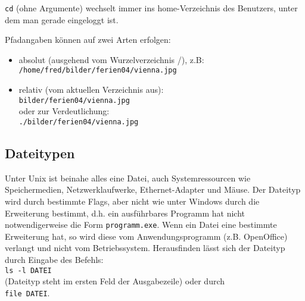 \documentclass[11pt]{article}
\begin{document}
\texttt{cd} (ohne Argumente) wechselt immer ins home-Verzeichnis des
Benutzers, unter dem man gerade eingeloggt ist.

Pfadangaben können auf zwei Arten erfolgen:
\begin{itemize}
\item absolut (ausgehend vom Wurzelverzeichnis /), z.B: \\
\texttt{/home/fred/bilder/ferien04/vienna.jpg}
\item relativ (vom aktuellen Verzeichnis aus):\\
\texttt{bilder/ferien04/vienna.jpg}\\
oder zur Verdeutlichung:\\
\texttt{./bilder/ferien04/vienna.jpg}
\end{itemize}

\subsection{Dateitypen}
Unter Unix ist beinahe alles eine Datei, auch Systemressourcen wie
Speichermedien, Netzwerklaufwerke, Ethernet-Adapter und Mäuse. Der
Dateityp wird durch bestimmte Flags, aber nicht wie unter Windows durch
die Erweiterung bestimmt, d.h. ein ausführbares Programm hat nicht
notwendigerweise die Form \texttt{programm.exe}. Wenn ein Datei eine
bestimmte Erweiterung hat, so wird diese vom Anwendungsprogramm (z.B.
OpenOffice) verlangt und nicht vom Betriebssystem. Herausfinden lässt
sich der Dateityp durch Eingabe des Befehls:\\
\texttt{ls -l DATEI} \\
(Dateityp steht im ersten Feld der Ausgabezeile) oder durch \\
\texttt{file DATEI}. 
\end{document}
